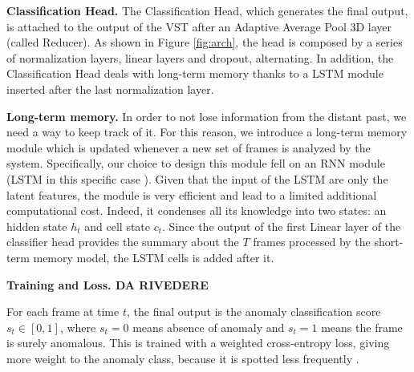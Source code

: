 \noindent\textbf{Classification Head.}
The Classification Head, which generates the final output, is attached to the output of the VST after an Adaptive Average Pool 3D layer (called Reducer).
As shown in Figure \ref{fig:arch}, the head is composed by a series of normalization layers, linear layers and dropout, alternating. 
In addition, the Classification Head deals with long-term memory thanks to a LSTM module inserted after the last normalization layer.






\noindent\textbf{Long-term memory.}
In order to not lose information from the distant past, we need a way to keep track of it.
For this reason, we introduce a long-term memory module  which is updated whenever a new set of frames is analyzed by the system.
Specifically, our choice to design this module fell on an RNN module (LSTM in this specific case ).
Given that the input of the LSTM  are only the latent features, the module is very efficient and lead to a limited additional computational cost.
Indeed, it condenses all its knowledge into two states: an hidden state $h_t$ and cell state $c_t$.
Since the output of the first Linear layer of the classifier head provides the summary about the $T$ frames processed by the short-term memory model, the LSTM cells is added after it.




\noindent\textbf{Training and Loss. DA RIVEDERE}

For each frame at time $t$, the final output is the anomaly classification score $s_t \in [0,1]$, where $s_t=0$ means absence of anomaly and $s_t=1$ means the frame is surely anomalous.
This is trained with a weighted cross-entropy loss, giving more weight to the anomaly class, because it is spotted less frequently  .